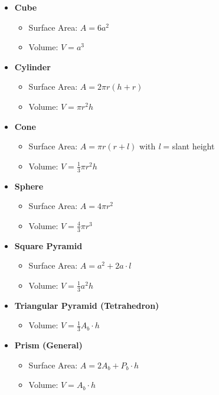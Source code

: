 \begin{itemize}
	\item \textbf{Cube}
	      \begin{itemize}
		      \item Surface Area: \(A = 6a^2\)
		      \item Volume: \(V = a^3\)
	      \end{itemize}

	\item \textbf{Cylinder}
	      \begin{itemize}
		      \item Surface Area: \(A = 2\pi r(h + r)\)
		      \item Volume: \(V = \pi r^2 h\)
	      \end{itemize}

	\item \textbf{Cone}
	      \begin{itemize}
		      \item Surface Area: \(A = \pi r(r + l)\) with \emph{l} = slant height
		      \item Volume: \(V = \frac{1}{3}\pi r^2 h\)
	      \end{itemize}

	\item \textbf{Sphere}
	      \begin{itemize}
		      \item Surface Area: \(A = 4\pi r^2\)
		      \item Volume: \(V = \frac{4}{3} \pi r^3\)
	      \end{itemize}

	\item \textbf{Square Pyramid}
	      \begin{itemize}
		      \item Surface Area: \(A = a^2 + 2a \cdot l\)
		      \item Volume: \(V = \frac{1}{3} a^2 h\)
	      \end{itemize}

	\item \textbf{Triangular Pyramid (Tetrahedron)}
	      \begin{itemize}
		      \item Volume: \(V = \frac{1}{3} A_b \cdot h\)
	      \end{itemize}

	\item \textbf{Prism (General)}
	      \begin{itemize}
		      \item Surface Area: \(A = 2A_b + P_b \cdot h\)
		      \item Volume: \(V = A_b \cdot h\)
	      \end{itemize}
\end{itemize}

